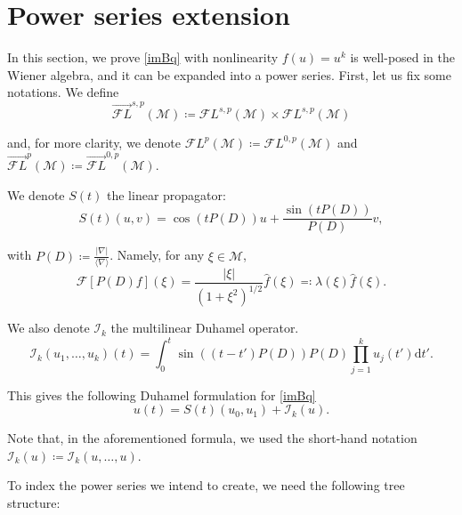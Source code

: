 \documentclass[letterpaper, 11pt,  reqno]{amsart}
\newcommand{\1}{\hspace{0.5mm}\text{I}\hspace{0.5mm}}
\newcommand{\I}{\mathcal{I}}
\newcommand{\noi}{\noindent}
\newcommand{\M}{\mathcal{M}}
\newcommand{\FL}{\mathcal{F}L} %
\newcommand{\FLv}{\overrightarrow{\mathcal{F}L}}
\newcommand{\F}{\mathcal{F}}
\newcommand{\nb}{\nabla}
\newcommand{\ld}{\lambda}
\newcommand{\jb}[1]
{\langle #1 \rangle}
\numberwithin{equation}{section}
\numberwithin{theorem}{section}
\newcommand{\abs}[1]{\lvert#1\rvert}
\begin{document}



\section{Power series extension}
\label{PowerSeries}

In this section, we prove \eqref{imBq} with nonlinearity $f(u) = u^k$ is well-posed in the Wiener algebra, and it can be expanded into a power series. First, let us fix some notations. We define 
$$
\FLv^{s,p}(\M) \coloneqq \FL^{s,p}(\M) \times \FL^{s,p}(\M)
$$

\noi and, for more clarity, we denote $\FL^{p}(\M) \coloneqq \FL^{0, p}(\M)$ and $\FLv^{p}(\M) \coloneqq \FLv^{0,p}(\M)$.

We denote $S(t)$ the linear propagator:
\begin{equation}
\label{EQ:linearOp}
S(t)(u,v) = \cos\left(t P(D)\right) u +  \frac{\sin\left(tP(D)\right)}{P(D)} v,
\end{equation}

\noi with $P(D) \coloneqq \frac{\abs{\nb}}{\jb{\nb}}$. Namely, for any $\xi \in \M$,
$$
\F \left[P(D)f\right](\xi) = \frac{\abs{\xi}}{( 1 + \xi^2)^{1/2}} \widehat{f}(\xi) \eqqcolon \ld(\xi) \widehat{f}(\xi).
$$

\noi We also denote $\I_k$ the multilinear Duhamel operator.
\begin{equation}
\label{Eq:DuhamelOp}
\I_k(u_1, \dots, u_k)(t) = \int^{t}_0  \sin\left((t-t')P(D)\right) P(D) \prod^k_{j = 1} u_j (t') \mathrm{d}t'.
\end{equation}

\noi This gives the following Duhamel formulation for \eqref{imBq}
\begin{equation}
\label{Eq:duhamelP}
u(t) = S(t) (u_0, u_1) + \I_k (u).
\end{equation}

\noi Note that, in the aforementioned formula, we used the short-hand notation $\I_k (u) \coloneqq \I_k(u, \dots, u)$.

To index the power series we intend to create, we need the following tree structure:
\end{document}
